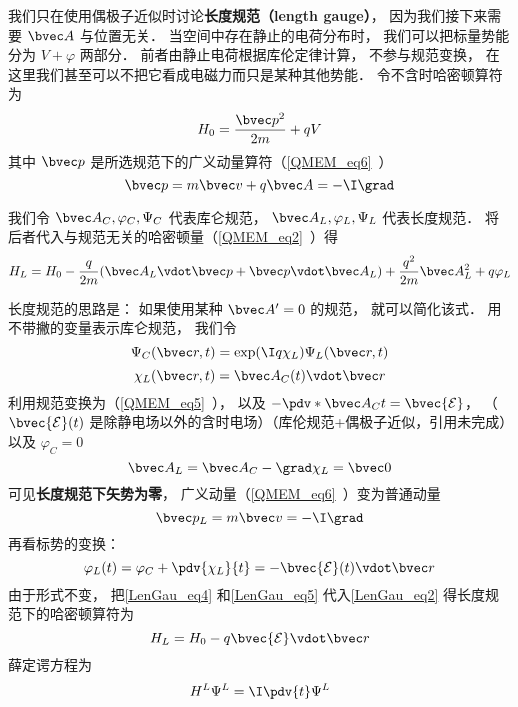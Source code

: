 
\begin{issues}
\issueTODO
\end{issues}


我们只在使用偶极子近似时讨论\textbf{长度规范（length gauge）}， 因为我们接下来需要 $\bvec A$ 与位置无关． 当空间中存在静止的电荷分布时， 我们可以把标量势能分为 $V + \varphi$ 两部分． 前者由静止电荷根据库伦定律计算， 不参与规范变换， 在这里我们甚至可以不把它看成电磁力而只是某种其他势能． 令不含时哈密顿算符为
\begin{equation}
H_0 = \frac{\bvec p^2}{2m} + qV
\end{equation}
其中 $\bvec p$ 是所选规范下的广义动量算符（\autoref{QMEM_eq6}~）
\begin{equation}
\bvec p = m \bvec v + q\bvec A = -\I \grad
\end{equation}

我们令 $\bvec A_C, \varphi_C, \Psi_C$ 代表库仑规范， $\bvec A_L, \varphi_L, \Psi_L$ 代表长度规范． 将后者代入与规范无关的哈密顿量（\autoref{QMEM_eq2}~）得
\begin{equation}\label{LenGau_eq2}
H_L = H_0 - \frac{q}{2m} (\bvec A_L \vdot \bvec p + \bvec p \vdot \bvec A_L)
+ \frac{q^2}{2m} \bvec A_L^2 + q \varphi_L
\end{equation}


长度规范的思路是： 如果使用某种 $\bvec A' = 0$ 的规范， 就可以简化该式． 用不带撇的变量表示库仑规范， 我们令
\begin{equation}\label{LenGau_eq1}
\Psi_C(\bvec r, t) = \exp(\I q\chi_L)\Psi_L(\bvec r, t)
\end{equation}
\begin{equation}
\chi_L(\bvec r, t) = \bvec A_C(t) \vdot \bvec r
\end{equation}
利用规范变换为（\autoref{QMEM_eq5}~）， 以及 $-\pdv*{\bvec A_C}{t} = \bvec {\mathcal E}$， （$\bvec {\mathcal E}(t)$ 是除静电场以外的含时电场）（库伦规范+偶极子近似，引用未完成）以及 $\varphi_C = 0$
\begin{equation}\label{LenGau_eq4}
\bvec A_L = \bvec A_C - \grad \chi_L = \bvec 0
\end{equation}
可见\textbf{长度规范下矢势为零}， 广义动量（\autoref{QMEM_eq6}~）变为普通动量
\begin{equation}
\bvec p_L = m \bvec v = -\I \grad
\end{equation}
再看标势的变换：
\begin{equation}\label{LenGau_eq5}
\varphi_L(t) = \varphi_C + \pdv{\chi_L}{t} = -\bvec {\mathcal E}(t) \vdot \bvec r
\end{equation}
由于形式不变， 把\autoref{LenGau_eq4} 和\autoref{LenGau_eq5} 代入\autoref{LenGau_eq2} 得长度规范下的哈密顿算符为
\begin{equation}
H_L = H_0 - q\bvec{\mathcal{E}} \vdot \bvec r
\end{equation}
薛定谔方程为
\begin{equation}
H^L \Psi^L = \I \pdv{t} \Psi^L
\end{equation}

